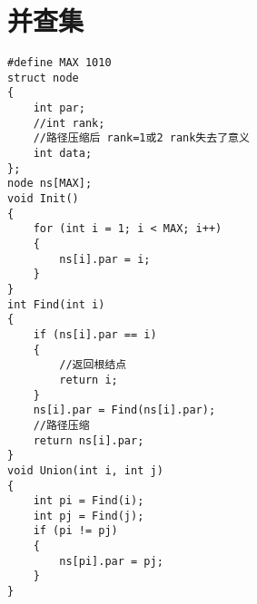 \section{并查集}
\begin{lstlisting}
#define MAX 1010
struct node
{
    int par;
    //int rank;
    //路径压缩后 rank=1或2 rank失去了意义
    int data;
};
node ns[MAX];
void Init()
{
    for (int i = 1; i < MAX; i++)
    {
        ns[i].par = i;
    }
}
int Find(int i)
{
    if (ns[i].par == i)
    {
        //返回根结点
        return i;
    }
    ns[i].par = Find(ns[i].par);
    //路径压缩
    return ns[i].par;
}
void Union(int i, int j)
{
    int pi = Find(i);
    int pj = Find(j);
    if (pi != pj)
    {
        ns[pi].par = pj;
    }
}
\end{lstlisting}